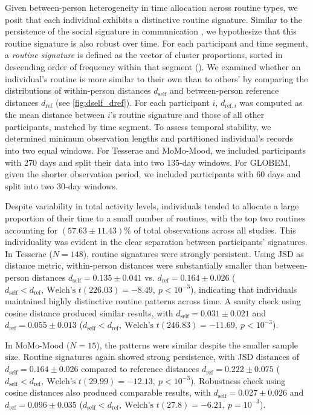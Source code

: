 \documentclass[pdflatex,sn-vancouver,Numbered]{bst/sn-jnl}%
\theoremstyle{thmstyleone}%
\theoremstyle{thmstyletwo}%
\theoremstyle{thmstylethree}%
\newcommand{\dself}[2]{$d_{\text{self}} = #1 \pm #2$}
\newcommand{\dref}[2]{$d_{\text{ref}} = #1 \pm #2$}
\newcommand{\dselfdrefp}[3]{$d_{\text{self}} < d_{\text{ref}},\ \text{Welch's } t(#1) = #2,\ p = #3$}
\newcommand{\dselfdrefpl}[3]{$d_{\text{self}} < d_{\text{ref}},\ \text{Welch's } t(#1) = #2,\ p < #3$}
\begin{document}
Given between-person heterogeneity in time allocation across routine types, we posit that each individual exhibits a distinctive routine signature. Similar to the persistence of the social signature in communication \cite{saramaki2014persistence}, we hypothesize that this routine signature is also robust over time. For each participant and time segment, a \textit{routine signature} is defined as the vector of cluster proportions, sorted in descending order of frequency within that segment (). We examined whether an individual’s routine is more similar to their own than to others’ by comparing the distributions of within-person distances \(d_{\text{self}}\) and between-person reference distances \(d_{\text{ref}}\) (see \autoref{fig:dself_dref}). For each participant \(i\), \(d_{\text{ref},i}\) was computed as the mean distance between \(i\)’s routine signature and those of all other participants, matched by time segment. To assess temporal stability, we determined minimum observation lengths and partitioned individual's records into two equal windows. For Tesserae and MoMo-Mood, we included participants with 270 days and split their data into two 135-day windows. For GLOBEM, given the shorter observation period, we included participants with 60 days and split into two 30-day windows.

Despite variability in total activity levels, individuals tended to allocate a large proportion of their time to a small number of routines, with the top two routines accounting for $(57.63 \pm 11.43)\%$ of total observations across all studies. This individuality was evident in the clear separation between participants’ signatures. In Tesserae (\(N=148\)), routine signatures were strongly persistent. Using JSD as distance metric, within-person distances were substantially smaller than between-person distances \dself{0.135}{0.041} vs. \dref{0.164}{0.026} (\dselfdrefpl{226.03}{-8.49}{10^{-3}}), indicating that individuals maintained highly distinctive routine patterns across time. A sanity check using cosine distance produced similar results, with \dself{0.031}{0.021} and \dref{0.055}{0.013} (\dselfdrefpl{246.83}{-11.69}{10^{-3}}).  

In MoMo-Mood (\(N=15\)), the patterns were similar despite the smaller sample size. Routine signatures again showed strong persistence, with JSD distances of \dself{0.164}{0.026} compared to reference distances \dref{0.222}{0.075} (\dselfdrefpl{29.99}{-12.13}{10^{-3}}). Robustness check using cosine distances also produced comparable results, with \dself{0.027}{0.026} and \dref{0.096}{0.035} (\dselfdrefp{27.8}{-6.21}{ 10^{-3}}). 
\end{document}
